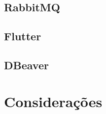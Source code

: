 \subsection{\textbf{RabbitMQ}}

\subsection{\textbf{Flutter}}

\subsection{\textbf{DBeaver}}

\section{\textbf{Considerações}}

\label{chap:metodologia}

\lipsum[2-5] %







